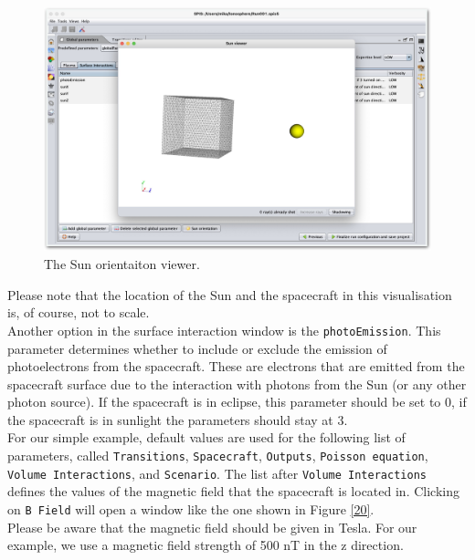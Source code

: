 \documentclass[a4paper, 12pt]{article}
\begin{document}
\begin{figure}[!ht]
    \centering
    \includegraphics[width=1\textwidth]{fig19.jpg}
    \caption{The Sun orientaiton viewer.}
    \label{19}
\end{figure}

Please note that the location of the Sun and the spacecraft in this visualisation is, of course, not to scale.\\

Another option in the surface interaction window is the \verb|photoEmission|. This parameter determines whether to include or exclude the emission of photoelectrons from the spacecraft. These are electrons that are emitted from the spacecraft surface due to the interaction with photons from the Sun (or any other photon source). If the spacecraft is in eclipse, this parameter should be set to 0, if the spacecraft is in sunlight the parameters should stay at 3.\\

For our simple example, default values are used for the following list of parameters, called \verb|Transitions|, \verb|Spacecraft|, \verb|Outputs|, \verb|Poisson equation|, \verb|Volume Interactions|, and \verb|Scenario|. The list after \verb|Volume Interactions| defines the values of the magnetic field that the spacecraft is located in. Clicking on \verb|B Field| will open a window like the one shown in Figure \ref{20}.\\

Please be aware that the magnetic field should be given in Tesla. For our example, we use a magnetic field strength of 500 nT in the z direction.\\
\end{document}
